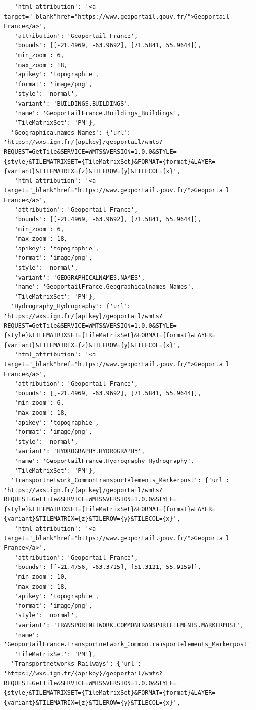 \documentclass[
  letterpaper,
  DIV=11,
  numbers=noendperiod]{scrreprt}
\begin{document}
\begin{verbatim}
   'html_attribution': '<a target="_blank"href="https://www.geoportail.gouv.fr/">Geoportail France</a>',
   'attribution': 'Geoportail France',
   'bounds': [[-21.4969, -63.9692], [71.5841, 55.9644]],
   'min_zoom': 6,
   'max_zoom': 18,
   'apikey': 'topographie',
   'format': 'image/png',
   'style': 'normal',
   'variant': 'BUILDINGS.BUILDINGS',
   'name': 'GeoportailFrance.Buildings_Buildings',
   'TileMatrixSet': 'PM'},
  'Geographicalnames_Names': {'url': 'https://wxs.ign.fr/{apikey}/geoportail/wmts?REQUEST=GetTile&SERVICE=WMTS&VERSION=1.0.0&STYLE={style}&TILEMATRIXSET={TileMatrixSet}&FORMAT={format}&LAYER={variant}&TILEMATRIX={z}&TILEROW={y}&TILECOL={x}',
   'html_attribution': '<a target="_blank"href="https://www.geoportail.gouv.fr/">Geoportail France</a>',
   'attribution': 'Geoportail France',
   'bounds': [[-21.4969, -63.9692], [71.5841, 55.9644]],
   'min_zoom': 6,
   'max_zoom': 18,
   'apikey': 'topographie',
   'format': 'image/png',
   'style': 'normal',
   'variant': 'GEOGRAPHICALNAMES.NAMES',
   'name': 'GeoportailFrance.Geographicalnames_Names',
   'TileMatrixSet': 'PM'},
  'Hydrography_Hydrography': {'url': 'https://wxs.ign.fr/{apikey}/geoportail/wmts?REQUEST=GetTile&SERVICE=WMTS&VERSION=1.0.0&STYLE={style}&TILEMATRIXSET={TileMatrixSet}&FORMAT={format}&LAYER={variant}&TILEMATRIX={z}&TILEROW={y}&TILECOL={x}',
   'html_attribution': '<a target="_blank"href="https://www.geoportail.gouv.fr/">Geoportail France</a>',
   'attribution': 'Geoportail France',
   'bounds': [[-21.4969, -63.9692], [71.5841, 55.9644]],
   'min_zoom': 6,
   'max_zoom': 18,
   'apikey': 'topographie',
   'format': 'image/png',
   'style': 'normal',
   'variant': 'HYDROGRAPHY.HYDROGRAPHY',
   'name': 'GeoportailFrance.Hydrography_Hydrography',
   'TileMatrixSet': 'PM'},
  'Transportnetwork_Commontransportelements_Markerpost': {'url': 'https://wxs.ign.fr/{apikey}/geoportail/wmts?REQUEST=GetTile&SERVICE=WMTS&VERSION=1.0.0&STYLE={style}&TILEMATRIXSET={TileMatrixSet}&FORMAT={format}&LAYER={variant}&TILEMATRIX={z}&TILEROW={y}&TILECOL={x}',
   'html_attribution': '<a target="_blank"href="https://www.geoportail.gouv.fr/">Geoportail France</a>',
   'attribution': 'Geoportail France',
   'bounds': [[-21.4756, -63.3725], [51.3121, 55.9259]],
   'min_zoom': 10,
   'max_zoom': 18,
   'apikey': 'topographie',
   'format': 'image/png',
   'style': 'normal',
   'variant': 'TRANSPORTNETWORK.COMMONTRANSPORTELEMENTS.MARKERPOST',
   'name': 'GeoportailFrance.Transportnetwork_Commontransportelements_Markerpost',
   'TileMatrixSet': 'PM'},
  'Transportnetworks_Railways': {'url': 'https://wxs.ign.fr/{apikey}/geoportail/wmts?REQUEST=GetTile&SERVICE=WMTS&VERSION=1.0.0&STYLE={style}&TILEMATRIXSET={TileMatrixSet}&FORMAT={format}&LAYER={variant}&TILEMATRIX={z}&TILEROW={y}&TILECOL={x}',

\end{verbatim}
\end{document}
